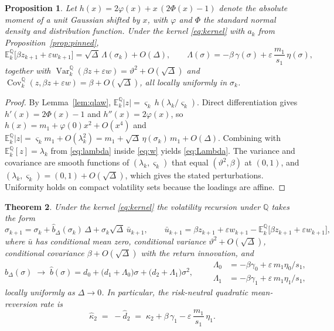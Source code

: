 \documentclass[11pt]{article}
\newtheorem{theorem}{Theorem}
\newtheorem{proposition}[theorem]{Proposition}
\theoremstyle{remark}
\newcommand{\E}{\mathbb{E}}
\newcommand{\Qm}{\mathbb{Q}}
\newcommand{\Dt}{\Delta}
\begin{document}
\begin{proposition}\label{prop:qmoments}
Let $h(x)=2\varphi(x)+x\,(2\Phi(x)-1)$ denote the absolute moment of a unit
Gaussian shifted by $x$, with $\varphi$ and $\Phi$ the standard normal
density and distribution function.
Under the kernel \eqref{eq:kernel} with $a_k$ from
Proposition~\ref{prop:pinned},
\begin{equation}\label{eq:Lambda}
\E^{\Qm}_k\big[\beta z_{k+1}+\varepsilon w_{k+1}\big]
=\sqrt{\Dt}\,\Lambda(\sigma_k)+O(\Dt),
\qquad
\Lambda(\sigma)
=-\beta\,\gamma(\sigma)+\varepsilon\,\frac{m_1}{s_1}\,\eta(\sigma),
\end{equation}
together with
$\operatorname{Var}^{\Qm}_k(\beta z+\varepsilon w)
=\vartheta^2+O(\sqrt{\Dt})$ and
$\operatorname{Cov}^{\Qm}_k(z,\beta z+\varepsilon w)
=\beta+O(\sqrt{\Dt})$,
all locally uniformly in $\sigma_k$.
\end{proposition}

\begin{proof}
By Lemma~\ref{lem:qlaw},
$\E^{\Qm}_k|z|=\varsigma_k\,h(\lambda_k/\varsigma_k)$.
Direct differentiation gives $h'(x)=2\Phi(x)-1$ and $h''(x)=2\varphi(x)$,
so $h(x)=m_1+\varphi(0)x^2+O(x^4)$ and
$\E^{\Qm}_k|z|=\varsigma_k m_1+O(\lambda_k^2)
= m_1+\sqrt{\Dt}\,\eta(\sigma_k)\,m_1+O(\Dt)$.
Combining with $\E^{\Qm}_k[z]=\lambda_k$ from \eqref{eq:lambda} inside
\eqref{eq:w} yields \eqref{eq:Lambda}.
The variance and covariance are smooth functions of
$(\lambda_k,\varsigma_k)$ that equal $(\vartheta^2,\beta)$ at $(0,1)$, and
$(\lambda_k,\varsigma_k)=(0,1)+O(\sqrt{\Dt})$, which gives the stated
perturbations.
Uniformity holds on compact volatility sets because the loadings are
affine.
\end{proof}

\begin{theorem}\label{thm:main}
Under the kernel \eqref{eq:kernel} the volatility recursion under $\Qm$
takes the form
\begin{equation}\label{eq:qrec}
\sigma_{k+1}=\sigma_k+\hat b_{\Dt}(\sigma_k)\,\Dt
+\sigma_k\sqrt{\Dt}\,\bar{u}_{k+1},
\qquad
\bar{u}_{k+1}=\beta z_{k+1}+\varepsilon w_{k+1}
-\E^{\Qm}_k\big[\beta z_{k+1}+\varepsilon w_{k+1}\big],
\end{equation}
where $\bar u$ has conditional mean zero, conditional variance
$\vartheta^2+O(\sqrt{\Dt})$, conditional covariance $\beta+O(\sqrt{\Dt})$
with the return innovation, and
\begin{equation}\label{eq:driftmap}
\hat b_{\Dt}(\sigma)\;\longrightarrow\;
\hat b(\sigma)= d_0+\big(d_1+\Lambda_0\big)\sigma
+\big(d_2+\Lambda_1\big)\sigma^{2},
\qquad
\begin{aligned}
\Lambda_0&=-\beta\gamma_0+\varepsilon\, m_1\eta_0/s_1,\\
\Lambda_1&=-\beta\gamma_1+\varepsilon\, m_1\eta_1/s_1,
\end{aligned}
\end{equation}
locally uniformly as $\Dt\to0$.
In particular, the risk-neutral quadratic mean-reversion rate is
\begin{equation}\label{eq:kappa2}
\hat\kappa_2 \;=\; -\hat d_2
\;=\; \kappa_2+\beta\,\gamma_1-\varepsilon\,\frac{m_1}{s_1}\,\eta_1 .
\end{equation}
\end{theorem}
\end{document}
